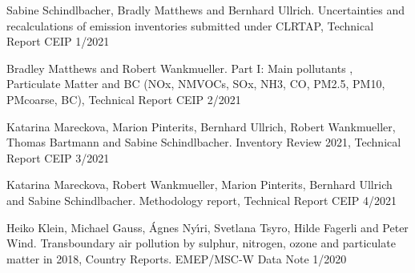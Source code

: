 \enlargethispage{\baselineskip}
\begin{list}{}{\setlength{\leftmargin}{15pt}\setlength{\itemindent}{-\leftmargin}}\small

\item[]  
Sabine Schindlbacher, Bradly Matthews and Bernhard Ullrich. Uncertainties and recalculations of emission inventories submitted under CLRTAP, Technical Report CEIP 1/2021

\item[]
Bradley Matthews and Robert Wankmueller. Part I:  Main pollutants , Particulate Matter and BC (NOx, NMVOCs, SOx, NH3, CO, PM2.5, PM10, PMcoarse, BC), Technical Report CEIP 2/2021

\item[]
 Katarina Mareckova, Marion Pinterits, Bernhard Ullrich,  Robert Wankmueller, Thomas Bartmann and Sabine Schindlbacher. Inventory Review 2021,  Technical Report CEIP 3/2021
  
\item[]
Katarina Mareckova, Robert Wankmueller, Marion Pinterits, Bernhard Ullrich and Sabine Schindlbacher. Methodology report, Technical Report CEIP 4/2021

\end{list}



 \enlargethispage{\baselineskip}
 \begin{list}{}{\setlength{\leftmargin}{15pt}\setlength{\itemindent}{-\leftmargin}}\small

 \item[]
 Heiko Klein, Michael Gauss, \'Agnes  Ny\'{\i}ri, Svetlana Tsyro, Hilde Fagerli and Peter Wind. 
Transboundary air pollution by sulphur, nitrogen, ozone and particulate matter in 2018, Country Reports. EMEP/MSC-W Data Note 1/2020


 \end{list}







\newpage
\renewcommand\bibname{References}      %
%

